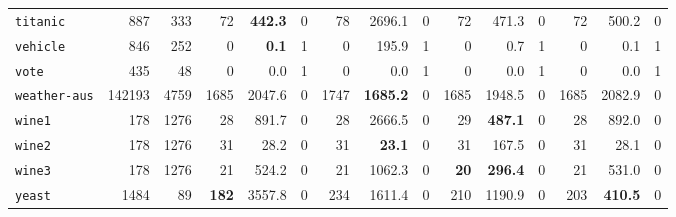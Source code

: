 \begin{tabular}{lccrrrrrrrrrrrr}
\texttt{titanic} & \multicolumn{1}{r}{887} & \multicolumn{1}{r}{333}  & 72 & \textbf{442.3} & 0 & 78 & 2696.1 & 0 & 72 & 471.3 & 0 & 72 & 500.2 & 0\\
\texttt{vehicle} & \multicolumn{1}{r}{846} & \multicolumn{1}{r}{252}  & 0 & \textbf{0.1} & 1 & 0 & 195.9 & 1 & 0 & 0.7 & 1 & 0 & 0.1 & 1\\
\texttt{vote} & \multicolumn{1}{r}{435} & \multicolumn{1}{r}{48}  & 0 & 0.0 & 1 & 0 & 0.0 & 1 & 0 & 0.0 & 1 & 0 & 0.0 & 1\\
\texttt{weather-aus} & \multicolumn{1}{r}{142193} & \multicolumn{1}{r}{4759}  & 1685 & 2047.6 & 0 & 1747 & \textbf{1685.2} & 0 & 1685 & 1948.5 & 0 & 1685 & 2082.9 & 0\\
\texttt{wine1} & \multicolumn{1}{r}{178} & \multicolumn{1}{r}{1276}  & 28 & 891.7 & 0 & 28 & 2666.5 & 0 & 29 & \textbf{487.1} & 0 & 28 & 892.0 & 0\\
\texttt{wine2} & \multicolumn{1}{r}{178} & \multicolumn{1}{r}{1276}  & 31 & 28.2 & 0 & 31 & \textbf{23.1} & 0 & 31 & 167.5 & 0 & 31 & 28.1 & 0\\
\texttt{wine3} & \multicolumn{1}{r}{178} & \multicolumn{1}{r}{1276}  & 21 & 524.2 & 0 & 21 & 1062.3 & 0 & \textbf{20} & \textbf{296.4} & 0 & 21 & 531.0 & 0\\
\texttt{yeast} & \multicolumn{1}{r}{1484} & \multicolumn{1}{r}{89}  & \textbf{182} & 3557.8 & 0 & 234 & 1611.4 & 0 & 210 & 1190.9 & 0 & 203 & \textbf{410.5} & 0\\
\bottomrule
\end{tabular}
